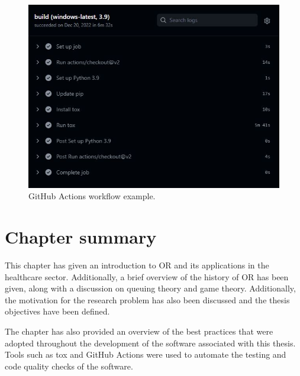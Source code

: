 \begin{figure}[H]
    \includegraphics[width=\linewidth]{chapters/01_introduction/Bin/github_actions.JPG}
    \caption{GitHub Actions workflow example.}
    \label{fig:github_actions}
\end{figure}


\section{Chapter summary}

This chapter has given an introduction to OR and its applications in the
healthcare sector.
Additionally, a brief overview of the history of OR has been given, along with
a discussion on queuing theory and game theory.
Additionally, the motivation for the research problem has also been discussed
and the thesis objectives have been defined.

The chapter has also provided an overview of the best practices that were
adopted throughout the development of the software associated with this thesis.
Tools such as tox and GitHub Actions were used to automate the testing
and code quality checks of the software.


